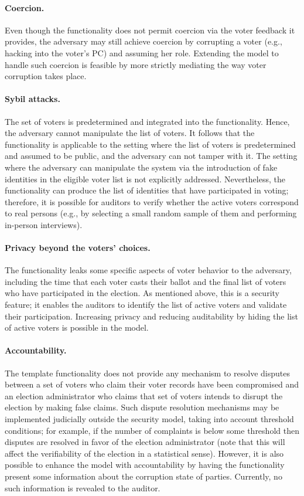 \paragraph{Coercion.} Even though the functionality does not permit
coercion via the voter feedback it provides, the adversary may still
achieve coercion by corrupting a voter (e.g., hacking into the voter's
PC) and assuming her role. Extending the model to handle such coercion
is feasible by more strictly mediating the way voter corruption takes
place.

\paragraph{Sybil attacks.} The set of voters is predetermined and
integrated into the functionality. Hence, the adversary cannot
manipulate the list of voters. It follows that the functionality is
applicable to the setting where the list of voters is predetermined
and assumed to be public, and the adversary can not tamper with it.
The setting where the adversary can manipulate the system via the
introduction of fake identities in the eligible voter list is not
explicitly addressed. Nevertheless, the functionality can produce the
list of identities that have participated in voting; therefore, it is
possible for auditors to verify whether the active voters correspond
to real persons (e.g., by selecting a small random sample of them and
performing in-person interviews).

\paragraph{Privacy beyond the voters' choices.} The functionality
leaks some specific aspects of voter behavior to the adversary,
including the time that each voter casts their ballot and the final
list of voters who have participated in the election. As mentioned
above, this is a security feature; it enables the auditors to identify
the list of active voters and validate their participation. Increasing
privacy and reducing auditability by hiding the list of active voters
is possible in the model.

\paragraph{Accountability.} The template functionality does not
provide any mechanism to resolve disputes between a set of voters who
claim their voter records have been compromised and an election
administrator who claims that set of voters intends to disrupt the
election by making false claims. Such dispute resolution mechanisms
may be implemented judicially outside the security model, taking into
account threshold conditions; for example, if the number of complaints
is below some threshold then disputes are resolved in favor of the
election administrator (note that this will affect the verifiability
of the election in a statistical sense). However, it is also possible
to enhance the model with accountability by having the functionality
present some information about the corruption state of parties.
Currently, no such information is revealed to the auditor.


